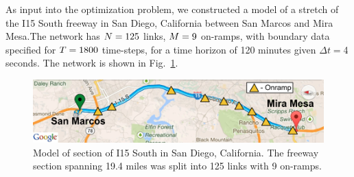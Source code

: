 As input into the optimization problem, we constructed a model of
a  stretch of the I15 South freeway in San Diego,
California between San Marcos and Mira Mesa.The network has $N=125$ links, $M=9$ on-ramps,
with boundary data specified for $T=1800$ time-steps,
for a time horizon of 120 minutes given $\Delta t=$4 seconds.
The network is shown in Fig.~\ref{fig:Model-of-section}.
\begin{figure}
\begin{centering}
\includegraphics[width=0.7\columnwidth]{images/map}
\par\end{centering}

\caption{Model of section of I15 South in San Diego, California. The freeway
section spanning 19.4 miles was split into 125 links with 9 on-ramps.\label{fig:Model-of-section}}
\end{figure}


